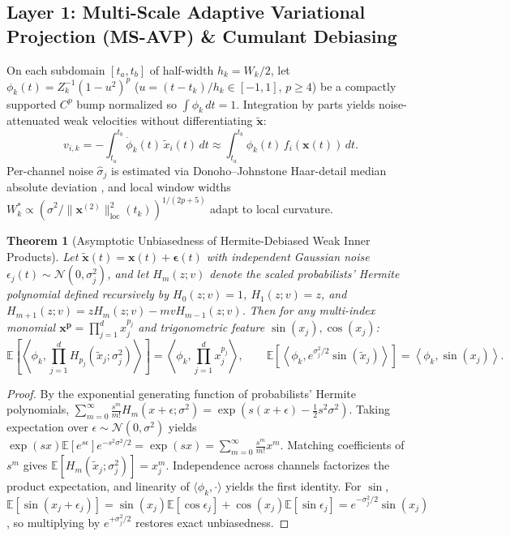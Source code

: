 \documentclass[10pt]{article} %
\newtheorem{theorem}{Theorem}
\begin{document}
\subsection{Layer 1: Multi-Scale Adaptive Variational Projection (MS-AVP) \& Cumulant Debiasing}
On each subdomain $[t_a, t_b]$ of half-width $h_k = W_k/2$, let $\phi_k(t) = Z_k^{-1}(1 - u^2)^p$ ($u=(t-t_k)/h_k \in [-1,1]$, $p \ge 4$) be a compactly supported $C^p$ bump normalized so $\int \phi_k\,dt = 1$. Integration by parts yields noise-attenuated weak velocities without differentiating $\tilde{\mathbf{x}}$:
\begin{equation}
  v_{i,k} = -\int_{t_a}^{t_b} \dot{\phi}_k(t)\,\tilde{x}_i(t)\,dt \approx \int_{t_a}^{t_b} \phi_k(t)\,f_i(\mathbf{x}(t))\,dt.
\end{equation}
Per-channel noise $\hat{\sigma}_j$ is estimated via Donoho--Johnstone Haar-detail median absolute deviation \citep{donoho1994ideal}, and local window widths $W_k^* \propto (\hat{\sigma}^2 / \|\mathbf{x}^{(2)}\|^2_{\text{loc}}(t_k))^{1/(2p+5)}$ adapt to local curvature.

\begin{theorem}[Asymptotic Unbiasedness of Hermite-Debiased Weak Inner Products]
\label{thm:hermite}
Let $\tilde{\mathbf{x}}(t) = \mathbf{x}(t) + \boldsymbol{\epsilon}(t)$ with independent Gaussian noise $\epsilon_j(t) \sim \mathcal{N}(0, \sigma_j^2)$, and let $H_m(z; v)$ denote the scaled probabilists' Hermite polynomial defined recursively by $H_0(z;v)=1$, $H_1(z;v)=z$, and $H_{m+1}(z;v) = z H_m(z;v) - m v H_{m-1}(z;v)$. Then for any multi-index monomial $\mathbf{x}^{\mathbf{p}} = \prod_{j=1}^d x_j^{p_j}$ and trigonometric feature $\sin(x_j), \cos(x_j)$:
\begin{equation}
  \mathbb{E}\!\left[\left\langle \phi_k, \prod_{j=1}^d H_{p_j}(\tilde{x}_j; \sigma_j^2) \right\rangle\right] = \left\langle \phi_k, \prod_{j=1}^d x_j^{p_j} \right\rangle, \qquad
  \mathbb{E}\!\left[\left\langle \phi_k, e^{\sigma_j^2/2}\sin(\tilde{x}_j) \right\rangle\right] = \left\langle \phi_k, \sin(x_j) \right\rangle.
\end{equation}
\end{theorem}
\begin{proof}
By the exponential generating function of probabilists' Hermite polynomials, $\sum_{m=0}^\infty \frac{s^m}{m!} H_m(x+\epsilon; \sigma^2) = \exp\!\left(s(x+\epsilon) - \frac{1}{2}s^2\sigma^2\right)$. Taking expectation over $\epsilon \sim \mathcal{N}(0,\sigma^2)$ yields $\exp(sx)\mathbb{E}[e^{s\epsilon}]e^{-s^2\sigma^2/2} = \exp(sx) = \sum_{m=0}^\infty \frac{s^m}{m!} x^m$. Matching coefficients of $s^m$ gives $\mathbb{E}[H_m(\tilde{x}_j;\sigma_j^2)] = x_j^m$. Independence across channels factorizes the product expectation, and linearity of $\langle \phi_k, \cdot \rangle$ yields the first identity. For $\sin$, $\mathbb{E}[\sin(x_j+\epsilon_j)] = \sin(x_j)\mathbb{E}[\cos\epsilon_j] + \cos(x_j)\mathbb{E}[\sin\epsilon_j] = e^{-\sigma_j^2/2}\sin(x_j)$, so multiplying by $e^{+\sigma_j^2/2}$ restores exact unbiasedness.
\end{proof}
\end{document}
